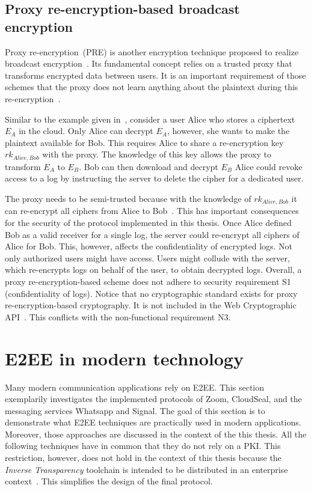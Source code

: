 \documentclass[../main.tex]{subfiles}
\begin{document}
\subsection{Proxy re-encryption-based broadcast encryption}
\label{sec:broadcast-proxy}
Proxy re-encryption~(PRE) is another encryption technique proposed to realize broadcast encryption~\cite{Hagg2022}.
Its fundamental concept relies on a trusted proxy that transforms encrypted data between users.
It is an important requirement of those schemes that the proxy does not learn anything about the plaintext during this re-encryption~\cite{Chen2018}.

Similar to the example given in~\cite{Hagg2022}, consider a user Alice who stores a ciphertext $E_A$ in the cloud.
Only Alice can decrypt $E_A$, however, she wants to make the plaintext available for Bob.
This requires Alice to share a re-encryption key $rk_{Alice,Bob}$ with the proxy.
The knowledge of this key allows the proxy to transform $E_A$ to $E_B$.
Bob can then download and decrypt $E_B$
Alice could revoke access to a log by instructing the server to delete the cipher for a dedicated user.

The proxy needs to be semi-trusted because with the knowledge of $rk_{Alice,Bob}$ it can re-encrypt all ciphers from Alice to Bob~\cite{Chen2018}.
This has important consequences for the security of the protocol implemented in this thesis.
Once Alice defined Bob as a valid receiver for a single log, the server could re-encrypt all ciphers of Alice for Bob.
This, however, affects the confidentiality of encrypted logs.
Not only authorized users might have access.
Users might collude with the server, which re-encrypts logs on behalf of the user, to obtain decrypted logs.
Overall, a proxy re-encryption-based scheme does not adhere to security requirement S1 (confidentiality of logs).
Notice that no cryptographic standard exists for proxy re-encryption-based cryptography.
It is not included in the Web Cryptographic API~\cite{WebCryptoApi2017}.
This conflicts with the non-functional requirement N3.

\section{E2EE in modern technology}
\label{sec:modern-e2ee}

Many modern communication applications rely on E2EE. 
This section exemplarily investigates the implemented protocols of Zoom, CloudSeal, and the messaging services Whatsapp and Signal.
The goal of this section is to demonstrate what E2EE techniques are practically used in modern applications.
Moreover, those approaches are discussed in the context of the this thesis.
All the following techniques have in common that they do not rely on a PKI.
This restriction, however, does not hold in the context of this thesis because the \emph{Inverse Transparency} toolchain is intended to be distributed in an enterprise context~\cite{Zieglmeier2021}.
This simplifies the design of the final protocol.
\end{document}
